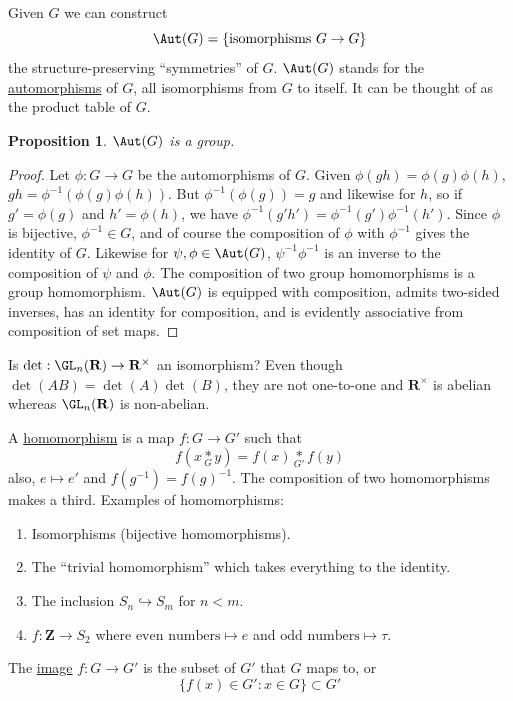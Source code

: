 \documentclass[11pt, oneside]{amsart}
\numberwithin{equation}{section}
\numberwithin{theorem}{section}
\newtheorem{proposition}[theorem]{Proposition}
\theoremstyle{definition}
\def\Z{\mathbf{Z}}
\def\R{\mathbf{R}}
\begin{document}
Given $G$ we can construct 
$$
\Aut(G) = \{\textrm{isomorphisms } G\to G\}
$$
the structure-preserving ``symmetries'' of $G$. $\Aut(G)$ stands for the \underline{automorphisms} of $G$, all isomorphisms from $G$ to itself. It can be thought of as the product table of $G$.
\begin{proposition} {$\Aut(G)$ is a group.}\end{proposition}

\begin{proof}
Let $\phi : G\to G$ be the automorphisms of $G$. Given $\phi(gh) = \phi(g)\phi(h)$, $gh = \phi^{-1}(\phi(g)\phi(h))$. But $\phi^{-1}(\phi(g)) = g$ and likewise for $h$, so if $g' = \phi(g)$ and $h' = \phi(h)$, we have $\phi^{-1}(g'h') = \phi^{-1}(g')\phi^{-1}(h')$. Since $\phi$ is bijective, $\phi^{-1}\in G$, and of course the composition of $\phi$ with $\phi^{-1}$ gives the identity of $G$. Likewise for $\psi, \phi \in \Aut(G)$, $\psi^{-1}\phi^{-1}$ is an inverse to the composition of $\psi$ and $\phi$. The composition of two group homomorphisms is a group homomorphism. $\Aut(G)$ is equipped with composition, admits two-sided inverses, has an identity for composition, and is evidently associative from composition of set maps.
\end{proof}

Is $\det : \GL_n(\R)\to\R^\times$ an isomorphism? Even though $\det (AB) = \det( A) \det (B)$, they are not one-to-one and $\R^\times$ is abelian whereas $\GL_n(\R)$ is non-abelian.

A \underline{homomorphism} is a map $f : G\to G'$ such that 
$$
{f({x\underset{G}{*}y})} = {f(x) \underset{G'}{*} f(y)}
$$
also, $e \mapsto e'$ and $f(g^{-1}) = f(g)^{-1}$. The composition of two homomorphisms makes a third.
Examples of homomorphisms:
\begin{enumerate}[label=(\roman*)]
\item Isomorphisms (bijective homomorphisms). 
\item The ``trivial homomorphism'' which takes everything to the identity. 
\item The inclusion $S_n \hookrightarrow S_m$ for $n<m$.
\item $f : \Z \to S_2$ where $\textrm{even numbers} \mapsto e$ and $\textrm{odd numbers} \mapsto \tau$.
\end{enumerate}


The \underline{image} $f :G\to G'$ is the subset of $G'$ that $G$ maps to, or
$$
\{f(x)\in G' : x\in G\} \subset G'
$$
\end{document}
